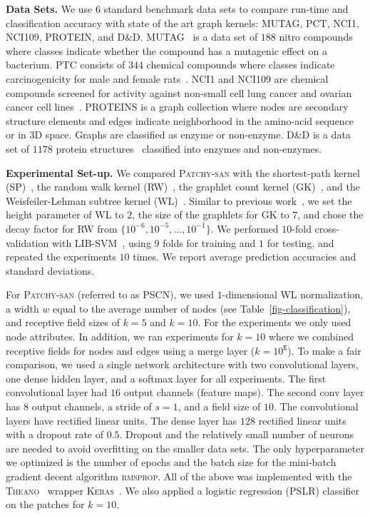 \documentclass{article}
\begin{document}
{\bf Data Sets.}
We use $6$ standard benchmark data sets to compare run-time and classification accuracy with state of the art graph kernels: MUTAG, PCT, NCI1, NCI109, PROTEIN, and D\&D. MUTAG~\cite{debnath:1991} is a data set of $188$ nitro compounds where classes indicate whether the compound has a mutagenic effect on a bacterium. PTC consists of $344$ chemical compounds where classes indicate carcinogenicity for male and female rats~\cite{toivonen:2003}. NCI1 and NCI109 are chemical compounds screened for activity against non-small cell lung cancer and ovarian cancer cell lines~\cite{wale:2006}. PROTEINS is a graph collection where nodes are secondary structure elements and edges  indicate neighborhood in the amino-acid sequence or in 3D space. Graphs are classified as enzyme or non-enzyme. D\&D is a data set of $1178$ protein structures~\cite{Dobson:2003} classified into enzymes and non-enzymes. 

{\bf Experimental Set-up.}
We compared \textsc{Patchy-san} with the shortest-path kernel (SP)~\cite{Borgwardt:2005}, the random walk kernel (RW)~\cite{Gaertner:2003}, the graphlet count kernel (GK)~\cite{Shervashidze:2009}, and the Weisfeiler-Lehman subtree kernel (WL)~\cite{Shervashidze:2011}. Similar to previous work~\cite{Yanardag:2015}, we set the height parameter of WL to $2$, the size of the graphlets for GK to $7$, and chose the decay factor for RW from $\{10^{-6}, 10^{-5}, ..., 10^{-1}\}$.
We performed $10$-fold cross-validation with \textsc{LIB-SVM}~\cite{Chang:2011}, using $9$ folds for training and $1$ for testing, and repeated the experiments $10$ times. We report average prediction accuracies and standard deviations. 


For \textsc{Patchy-san} (referred to as PSCN), we used $1$-dimensional WL normalization, a width $w$ equal to the average number of nodes (see Table~\ref{fig-classification}), and receptive field sizes of $k=5$ and $k=10$. For the experiments we only used node attributes. In addition, we ran experiments for $k=10$ where we combined receptive fields for nodes and edges using a merge layer ($k=10^{\mathtt{E}}$). To make a fair comparison, we used a single network architecture with two convolutional layers, one dense hidden layer, and a softmax layer for all experiments. The first convolutional layer had $16$ output channels (feature maps). The second conv layer has $8$ output channels, a stride of $s=1$, and a  field size of $10$. The convolutional layers have rectified linear units. The dense layer has $128$ rectified linear units with a dropout rate of $0.5$. Dropout and the relatively small number of neurons are needed to avoid overfitting on the smaller data sets. The only hyperparameter we optimized is the number of epochs and the batch size for the mini-batch gradient decent algorithm \textsc{rmsprop}. All of the above was implemented with the \textsc{Theano}~\cite{bergstra:2010} wrapper \textsc{Keras}~\cite{chollet:2015}. We also applied a logistic regression (PSLR) classifier on the patches for $k=10$. 
\end{document}
